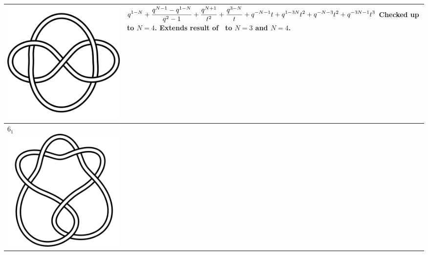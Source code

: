 \documentclass{compositio}
\theoremstyle{definition}
\numberwithin{equation}{section}
\begin{document}
{\begin{longtable}{p{}|p{}}
\includegraphics[scale=0.07,angle=0]{link5_1_2.pdf} 
& 
\newline
$
\displaystyle{%
q^{1-N}+\frac{q^{N-1} - q^{1-N}}{q^2-1}+\frac{q^{N+1}}{t^2}+\frac{q^{3-N}}{t}+q^{-N-1} t+q^{1-3N} t^2+q^{-N-3} t^2+q^{-3 N-1} t^3
}
$
\newline\newline\newline
Checked up to $N=4$. Extends result of~\cite{r0508510} to $N=3$ and $N=4$. 
\\
\hline
$6_{1}$ 
\includegraphics[scale=0.07,angle=0]{knot6_1.pdf} 

\end{longtable}}
\end{document}
